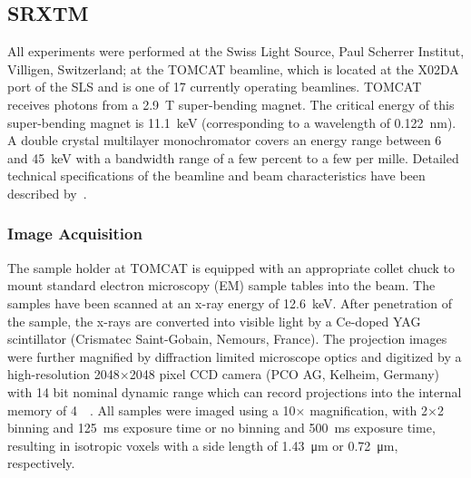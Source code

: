 \subsection{SRXTM}
All experiments were performed at the Swiss Light Source, Paul Scherrer Institut, Villigen, Switzerland; at the TOMCAT beamline, which is located at the X02DA port of the SLS and is one of 17 currently operating beamlines. TOMCAT receives photons from a \SI{2.9}{\tesla} super-bending magnet. The critical energy of this super-bending magnet is \SI{11.1}{\kilo\electronvolt} (corresponding to a wavelength of \SI{0.122}{\nano\meter}). A double crystal multilayer monochromator covers an energy range between 6 and \SI{45}{\kilo\electronvolt} with a bandwidth range of a few percent to a few per mille. Detailed technical specifications of the beamline and beam characteristics have been described by~\citet{Stampanoni2006a,Stampanoni2007}.

\subsubsection{Image Acquisition}
\label{seq:Image Acquisition}
The sample holder at TOMCAT is equipped with an appropriate collet chuck to mount standard electron microscopy (EM) sample tables into the beam. The samples have been scanned at an x-ray energy of \SI{12.6}{\kilo\electronvolt}. After penetration of the sample, the x-rays are converted into visible light by a Ce-doped YAG scintillator (Crismatec Saint-Gobain, Nemours, France). The projection images were further magnified by diffraction limited microscope optics and digitized by a high-resolution 2048\(\times\)2048 pixel CCD camera (PCO AG, Kelheim, Germany) with 14 bit nominal dynamic range which can record projections into the internal memory of \SI{4}{\giga\byte}. All samples were imaged using a 10\(\times\) magnification, with 2\(\times\)2 binning and \SI{125}{\milli\second} exposure time or no binning and \SI{500}{\milli\second} exposure time, resulting in isotropic voxels with a side length of \SI{1.43}{\micro\meter} or \SI{0.72}{\micro\meter}, respectively.

